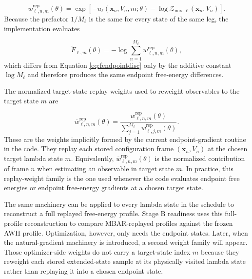 \begin{equation}
    w^{\mathrm{rep}}_{\ell,n,m}(\theta)
    =
    \exp \left[
        -u_\ell(\mathbf{x}_n, V_n, m; \theta)
        -
        \log \mathcal{Z}_{\mathrm{mix},\ell}(\mathbf{x}_n, V_n)
    \right].
    \label{eq:am}
\end{equation}
%
Because the prefactor $1/M_\ell$ is the same for every state of the same leg, the implementation evaluates

\begin{equation}
    \widetilde{F}_{\ell,m}(\theta)
    =
    -
    \log
    \sum_{n=1}^{M_\ell}
    w^{\mathrm{rep}}_{\ell,n,m}(\theta),
    \label{eq:fendpointimpl}
\end{equation}
%
which differs from Equation \eqref{eq:fendpointdisc} only by the additive constant $\log M_\ell$ and therefore produces the same endpoint free-energy differences.

The normalized target-state replay weights used to reweight observables to the target state $m$ are

\begin{equation}
    \overline{w}^{\mathrm{rep}}_{\ell,n,m}(\theta)
    =
    \frac{
        w^{\mathrm{rep}}_{\ell,n,m}(\theta)
    }{
        \sum_{j=1}^{M_\ell}
        w^{\mathrm{rep}}_{\ell,j,m}(\theta)
    }.
    \label{eq:omegam}
\end{equation}
%
These are the weights implicitly formed by the current endpoint-gradient routine in the code. They replay each stored configuration frame $(\mathbf{x}_n, V_n)$ at the chosen target lambda state $m$. Equivalently, $\overline{w}^{\mathrm{rep}}_{\ell,n,m}(\theta)$ is the normalized contribution of frame $n$ when estimating an observable in target state $m$. In practice, this replay-weight family is the one used whenever the code evaluates endpoint free energies or endpoint free-energy gradients at a chosen target state.

The same machinery can be applied to every lambda state in the schedule to reconstruct a full replayed free-energy profile. Stage B readiness uses this full-profile reconstruction to compare MBAR-replayed profiles against the frozen AWH profile. Optimization, however, only needs the endpoint states. Later, when the natural-gradient machinery is introduced, a second weight family will appear. Those optimizer-side weights do not carry a target-state index $m$ because they reweight each stored extended-state sample at its physically visited lambda state rather than replaying it into a chosen endpoint state.


